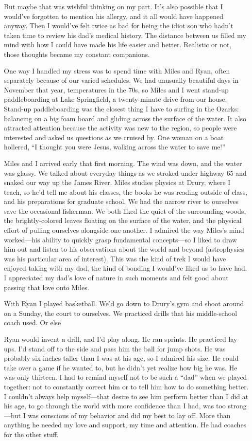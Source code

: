\documentclass[12pt]{book}
\begin{document}
But maybe that was wishful thinking on my part. It's also possible that I would've forgotten to mention his allergy, and it all would have happened anyway. Then I would've felt twice as bad for being the idiot son who hadn't taken time to review his dad's medical history. The distance between us filled my mind with how I could have made his life easier and better. Realistic or not, those thoughts became my constant companions.

One way I handled my stress was to spend time with Miles and Ryan, often separately because of our varied schedules. We had unusually beautiful days in November that year, temperatures in the 70s, so Miles and I went stand-up paddleboarding at Lake Springfield, a twenty-minute drive from our house. Stand-up paddleboarding was the closest thing I have to surfing in the Ozarks: balancing on a big foam board and gliding across the surface of the water. It also attracted attention because the activity was new to the region, so people were interested and asked us questions as we cruised by. One woman on a boat hollered, ``I thought you were Jesus, walking across the water to save me!''

Miles and I arrived early that first morning. The wind was down, and the water was glassy. We talked about everyday things as we stroked under highway 65 and snaked our way up the James River. Miles studies physics at Drury, where I teach, so he'd tell me about his classes, the books he was reading outside of class, and his preparations for graduate school. We had the narrow river to ourselves save the occasional fisherman. We both liked the quiet of the surrounding woods, the brightly-colored leaves floating on the surface of the water, and the physical effort of pulling ourselves alongside one another. I admired the way Miles's mind worked---his ability to quickly grasp fundamental concepts---so I liked to draw him out and listen to his observations about the world and beyond (astrophysics was his particular area of interest). This was the kind of trek I would have enjoyed taking with my dad, the kind of bonding I would've liked us to have had. I appreciated my dad's love of nature in such moments and felt good about passing that love onto Miles.

With Ryan I played basketball. We'd go down to Drury's gym and shoot around on a Sunday, the court to ourselves. We practiced drills that his middle-school coach used. Or else

Ryan would invent a drill, and I'd play along. He ran sprints. He practiced lay-ups. I'd stand off to the side and pass him the ball for jump shots. He was probably six inches taller than I was at his age, so I admired his size. He could take over a game if he wanted to, but he didn't yet realize how big he was. He was only thirteen. I had to remind myself not to be such a ``dad'' when we played together: not to constantly correct him or to tell him how to do something better. I couldn't always help myself---that desire to see him perform better than I did at his age, to go through the world with more confidence than I had, was too strong---but I was conscious of my behavior and did my best to lay off. More than anything he needed my love and support, my time and attention. He had coaches for the other stuff.
\end{document}
